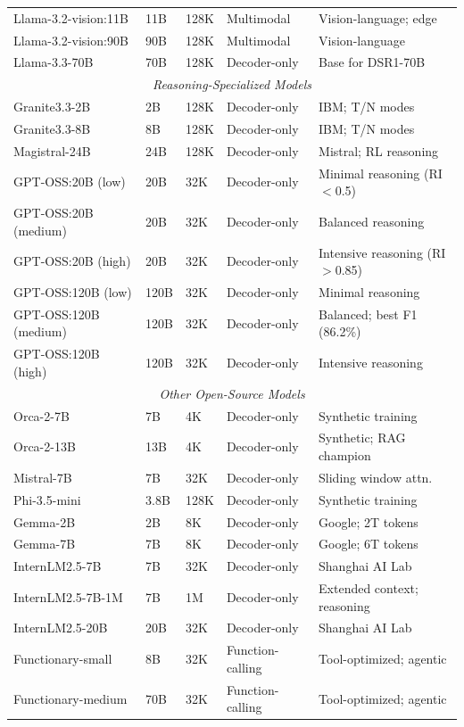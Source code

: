 \begin{longtable}{@{}p{3.5cm}p{1.8cm}p{2cm}p{2.2cm}p{3cm}@{}}
Llama-3.2-vision:11B & 11B & 128K & Multimodal & Vision-language; edge \\
Llama-3.2-vision:90B & 90B & 128K & Multimodal & Vision-language \\
Llama-3.3-70B & 70B & 128K & Decoder-only & Base for DSR1-70B \\
\midrule
\multicolumn{5}{c}{\textit{Reasoning-Specialized Models}} \\
\midrule
Granite3.3-2B & 2B & 128K & Decoder-only & IBM; T/N modes \\
Granite3.3-8B & 8B & 128K & Decoder-only & IBM; T/N modes \\
Magistral-24B & 24B & 128K & Decoder-only & Mistral; RL reasoning \\
GPT-OSS:20B (low) & 20B & 32K & Decoder-only & Minimal reasoning (RI$<$0.5) \\
GPT-OSS:20B (medium) & 20B & 32K & Decoder-only & Balanced reasoning \\
GPT-OSS:20B (high) & 20B & 32K & Decoder-only & Intensive reasoning (RI$>$0.85) \\
GPT-OSS:120B (low) & 120B & 32K & Decoder-only & Minimal reasoning \\
GPT-OSS:120B (medium) & 120B & 32K & Decoder-only & Balanced; best F1 (86.2\%) \\
GPT-OSS:120B (high) & 120B & 32K & Decoder-only & Intensive reasoning \\
\midrule
\multicolumn{5}{c}{\textit{Other Open-Source Models}} \\
\midrule
Orca-2-7B & 7B & 4K & Decoder-only & Synthetic training \\
Orca-2-13B & 13B & 4K & Decoder-only & Synthetic; RAG champion \\
Mistral-7B & 7B & 32K & Decoder-only & Sliding window attn. \\
Phi-3.5-mini & 3.8B & 128K & Decoder-only & Synthetic training \\
Gemma-2B & 2B & 8K & Decoder-only & Google; 2T tokens \\
Gemma-7B & 7B & 8K & Decoder-only & Google; 6T tokens \\
InternLM2.5-7B & 7B & 32K & Decoder-only & Shanghai AI Lab \\
InternLM2.5-7B-1M & 7B & 1M & Decoder-only & Extended context; reasoning \\
InternLM2.5-20B & 20B & 32K & Decoder-only & Shanghai AI Lab \\
Functionary-small & 8B & 32K & Function-calling & Tool-optimized; agentic \\
Functionary-medium & 70B & 32K & Function-calling & Tool-optimized; agentic \\
\end{longtable}

